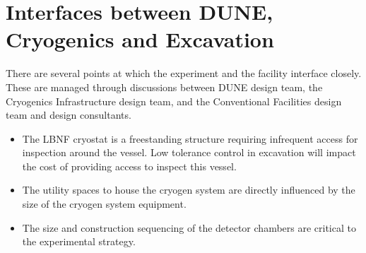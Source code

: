 \section{Interfaces between DUNE, Cryogenics and Excavation}
\label{sec:fscf-excav-interfaces}

There are several points at which the experiment and the facility interface closely. These are managed through discussions between DUNE design team, the Cryogenics Infrastructure design team, and the Conventional Facilities design team and design consultants.
\begin{itemize}
\item The LBNF cryostat is a freestanding structure requiring infrequent access for inspection around the vessel. Low tolerance control in excavation will impact the cost of providing access to inspect this vessel.
\item The utility spaces to house the cryogen system are directly influenced by the size of the cryogen system equipment.
\item The size and construction sequencing of the detector chambers are critical to the experimental strategy.
\end{itemize}




